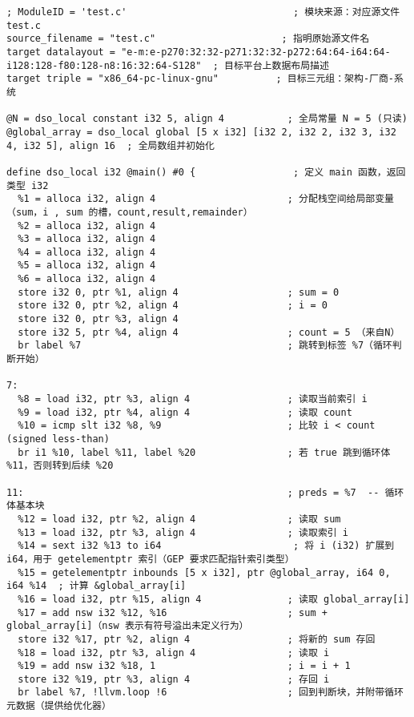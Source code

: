 \documentclass[a4paper]{article}
\begin{document}
\begin{lstlisting}[language=text,caption={test.ll}]
; ModuleID = 'test.c'                             ; 模块来源：对应源文件 test.c
source_filename = "test.c"                      ; 指明原始源文件名
target datalayout = "e-m:e-p270:32:32-p271:32:32-p272:64:64-i64:64-i128:128-f80:128-n8:16:32:64-S128"  ; 目标平台上数据布局描述
target triple = "x86_64-pc-linux-gnu"          ; 目标三元组：架构-厂商-系统

@N = dso_local constant i32 5, align 4           ; 全局常量 N = 5 (只读)
@global_array = dso_local global [5 x i32] [i32 2, i32 2, i32 3, i32 4, i32 5], align 16  ; 全局数组并初始化

define dso_local i32 @main() #0 {                 ; 定义 main 函数，返回类型 i32
  %1 = alloca i32, align 4                       ; 分配栈空间给局部变量（sum，i , sum 的槽，count,result,remainder）
  %2 = alloca i32, align 4                       
  %3 = alloca i32, align 4                       
  %4 = alloca i32, align 4                       
  %5 = alloca i32, align 4                       
  %6 = alloca i32, align 4                       
  store i32 0, ptr %1, align 4                   ; sum = 0
  store i32 0, ptr %2, align 4                   ; i = 0
  store i32 0, ptr %3, align 4                   
  store i32 5, ptr %4, align 4                   ; count = 5 （来自N）
  br label %7                                    ; 跳转到标签 %7（循环判断开始）

7:                                               
  %8 = load i32, ptr %3, align 4                 ; 读取当前索引 i
  %9 = load i32, ptr %4, align 4                 ; 读取 count
  %10 = icmp slt i32 %8, %9                      ; 比较 i < count (signed less-than)
  br i1 %10, label %11, label %20                ; 若 true 跳到循环体 %11，否则转到后续 %20

11:                                              ; preds = %7  -- 循环体基本块
  %12 = load i32, ptr %2, align 4                ; 读取 sum
  %13 = load i32, ptr %3, align 4                ; 读取索引 i
  %14 = sext i32 %13 to i64                       ; 将 i (i32) 扩展到 i64，用于 getelementptr 索引（GEP 要求匹配指针索引类型）
  %15 = getelementptr inbounds [5 x i32], ptr @global_array, i64 0, i64 %14  ; 计算 &global_array[i]
  %16 = load i32, ptr %15, align 4               ; 读取 global_array[i]
  %17 = add nsw i32 %12, %16                     ; sum + global_array[i]（nsw 表示有符号溢出未定义行为）
  store i32 %17, ptr %2, align 4                 ; 将新的 sum 存回
  %18 = load i32, ptr %3, align 4                ; 读取 i
  %19 = add nsw i32 %18, 1                       ; i = i + 1
  store i32 %19, ptr %3, align 4                 ; 存回 i
  br label %7, !llvm.loop !6                     ; 回到判断块，并附带循环元数据（提供给优化器）


\end{lstlisting}
\end{document}
